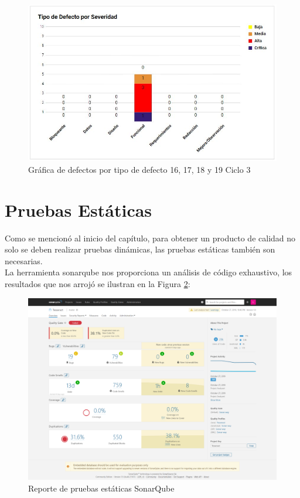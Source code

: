 \begin{figure}[H]
	\begin{center}
		\includegraphics[width=.65\textwidth]{images/pruebas/s16c3-2}
		\caption{Gráfica de defectos por tipo de defecto 16, 17, 18 y 19  Ciclo 3}
		\label{fig:infos16c3-2}
	\end{center}
\end{figure}


\newpage

\section{Pruebas Estáticas}
Como se mencionó al inicio del capítulo, para obtener un producto de calidad no solo se deben realizar pruebas dinámicas, las pruebas estáticas también son necesarias.\\ La herramienta sonarqube nos proporciona un análisis de código exhaustivo, los resultados que nos arrojó se ilustran en la Figura \ref{fig:infoesta}: \\

\begin{figure}[H]
	\begin{center}
		\includegraphics[width=.99\textwidth]{images/pruebas/estaticas/TesseractSonarFirstQualityTest}
		\caption{Reporte de pruebas estáticas SonarQube}
		\label{fig:infoesta}
	\end{center}
\end{figure}
